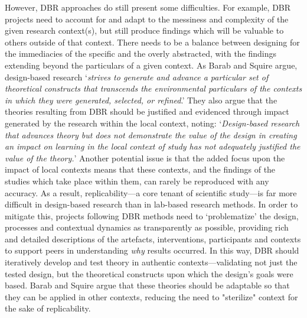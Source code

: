 However, DBR approaches do still present some difficulties. For example, DBR projects need to account for and adapt to the messiness and complexity of the given research context(s), but still produce findings which will be valuable to others outside of that context. There needs to be a balance between designing for the immediacies of the specific and the overly abstracted, with the findings extending beyond the particulars of a given context. As Barab and Squire argue, design-based research `\textit{strives to generate and advance a particular set of theoretical constructs that transcends the environmental particulars of the contexts in which they were generated, selected, or refined}.' They also argue that the theories resulting from DBR should be justified and evidenced through impact generated by the research within the local context, noting: `\textit{Design-based research that advances theory but does not demonstrate the value of the design in creating an impact on learning in the local context of study has not adequately justified the value of the theory.}' Another potential issue is that the added focus upon the impact of local contexts means that these contexts, and the findings of the studies which take place within them, can rarely be reproduced with any accuracy. As a result, replicability---a core tenant of scientific study---is far more difficult in design-based research than in lab-based research methods. In order to mitigate this, projects following DBR methods need to `problematize' the design, processes and contextual dynamics as transparently as possible, providing rich and detailed descriptions of the artefacts, interventions, participants and contexts to support peers in understanding \textit{why} results occurred. In this way, DBR should iteratively develop and test theory in authentic contexts---validating not just the tested design, but the theoretical constructs upon which the design's goals were based. Barab and Squire argue that these theories should be adaptable so that they can be applied in other contexts, reducing the need to "sterilize" context for the sake of replicability.

